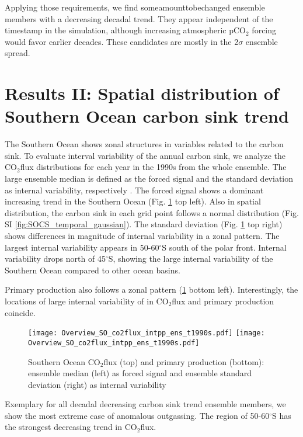 \documentclass[12pt]{article}
\begin{document}
Applying those requirements, we find someamounttobechanged ensemble members with a decreasing decadal trend. They appear independent of the timestamp in the simulation, although increasing atmospheric pCO$_2$ forcing would favor earlier decades. These candidates are mostly in the 2$\sigma$ ensemble spread. 


\section{Results II: Spatial distribution of Southern Ocean carbon sink trend}

The Southern Ocean shows zonal structures in variables related to the carbon sink. To evaluate interval variability of the annual carbon sink, we analyze the CO$_2$flux distributions for each year in the 1990s from the whole ensemble.
The large ensemble median is defined as the forced signal and the standard deviation as internal variability, respectively \citep{Deser2012}. The forced signal shows a dominant increasing trend in the Southern Ocean (Fig. \ref{fig:SOCS_ensmean_ensstd} top left). Also in spatial distribution, the carbon sink in each grid point follows a normal distribution (Fig. SI \ref{fig:SOCS_temporal_gaussian}). The standard deviation (Fig. \ref{fig:SOCS_ensmean_ensstd} top right) shows differences in magnitude of internal variability in a zonal pattern. The largest internal variability appears in 50-60$^\circ$S south of the polar front. Internal variability drops north of 45$^\circ$S, showing the large internal variability of the Southern Ocean compared to other ocean basins.

Primary production also follows a zonal pattern (\ref{fig:SOCS_ensmean_ensstd} bottom left). Interestingly, the locations of large internal variability of in CO$_2$flux and primary production coincide.

\begin{figure}[h]
\centering
\texttt{[image: Overview\_SO\_co2flux\_intpp\_ens\_t1990s.pdf]} %
\texttt{[image: Overview\_SO\_co2flux\_intpp\_ens\_t1990s.pdf]} %
\caption{Southern Ocean CO$_2$flux (top) and primary production (bottom): ensemble median (left) as forced signal and ensemble standard deviation (right) as internal variability}
\label{fig:SOCS_ensmean_ensstd}
\end{figure}

Exemplary for all decadal decreasing carbon sink trend ensemble members, we show the most extreme case of anomalous outgassing. The region of 50-60$^\circ$S has the strongest decreasing trend in CO$_2$flux.
\end{document}
